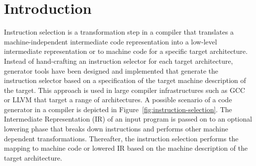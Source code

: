 \section{Introduction}

Instruction selection is a transformation step in a compiler that
translates a machine-independent intermediate code representation into
a low-level intermediate representation or to machine code for a
specific target architecture. Instead of hand-crafting an instruction
selector for each target architecture, generator tools have been
designed and implemented that generate the instruction selector based
on a specification of the target machine description of the
target. This approach is used in large compiler infrastructures such
as GCC or LLVM that target a range of architectures.  A possible
scenario of a code generator in a compiler is depicted in
Figure~\ref{fig:instruction-selection}. The Intermediate
Representation (IR) of an input program is passed on to an optional
lowering phase that breaks down instructions and performs other
machine dependent transformations. Thereafter, the instruction
selection performs the mapping to machine code or lowered IR based on
the machine description of the target architecture.


